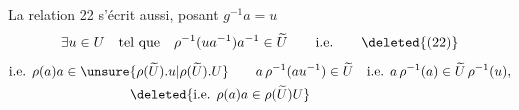 La relation 22 s'écrit aussi, posant $g^{-1}a=u$
\[
\exists u\in U\quad\text{tel que}\quad\rho^{-1}(ua^{-1})a^{-1}\in\widetilde U\qquad\text{i.e.}\tag*{\deleted{(22)}}
\]
\[
\begin{aligned}
&\text{i.e. }\rho(a)a\in\unsure{\rho(\widetilde U).u|{\rho(\widetilde U).U}} \qquad
a\,\rho^{-1}(au^{-1})\in\widetilde U\quad\text{i.e. }a\,\rho^{-1}(a)\in\widetilde U\,\rho^{-1}(u),\\
&\hspace{9em}\deleted{\text{i.e. }\rho(a)a\in\rho(\widetilde U)U}
\end{aligned}
\]

